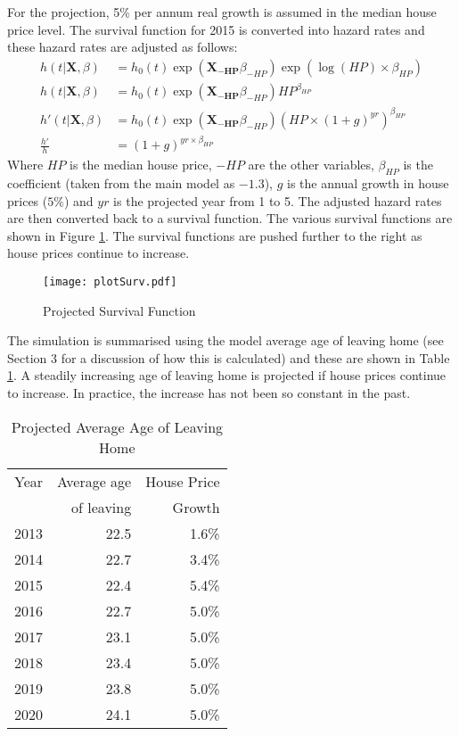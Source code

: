 \documentclass[12pt]{article}
\begin{document}
For the projection, 5\% per annum real growth is assumed in the median house price level. The survival function for 2015 is converted into hazard rates and these hazard rates are adjusted as follows:
\begin{align*}
    h(t|\mathbf{X}, \beta) &= h_0( t ) \exp( \mathbf{X_{-HP}}\beta_{-HP})  \exp ( \log(HP) \times  \beta_{HP} ) \\
    h(t|\mathbf{X}, \beta) &= h_0( t ) \exp( \mathbf{X_{-HP}}\beta_{-HP})  HP^{\beta_{HP}}  \\
    h'(t|\mathbf{X}, \beta) &= h_0( t ) \exp( \mathbf{X_{-HP}}\beta_{-HP}) (HP \times (1+g)^{yr})^{\beta_{HP}} \\
    \frac{h'}{h} &= (1+g)^{yr \times \beta_{HP}}
\end{align*}
Where $HP$ is the median house price, $-HP$ are the other variables, $\beta_{HP}$ is the coefficient (taken from the main model as $-1.3$), $g$ is the annual growth in house prices ($5\%$) and $yr$ is the projected year from 1 to 5. The adjusted hazard rates are then converted back to a survival function. The various survival functions are shown in Figure \ref{plotSurv}. The survival functions are pushed further to the right as house prices continue to increase.
\begin{figure}[htpb]
  \caption{Projected Survival Function}
  \label{plotSurv}
  \centering
  \texttt{[image: plotSurv.pdf]}
\end{figure}

The simulation is summarised using the model average age of leaving home (see Section 3 for a discussion of how this is calculated) and these are shown in Table \ref{ProgAvgAges}. A steadily increasing age of leaving home is projected if house prices continue to increase. In practice, the increase has not been so constant in the past.

\begin{table}[htbp]
\centering
\caption{Projected Average Age of Leaving Home}
\label{ProgAvgAges}
\begin{tabular}{lrr}
\toprule
Year & Average age & House Price \\
& of leaving & Growth \\
\midrule
2013 & 22.5 & 1.6\% \\
  2014 & 22.7 & 3.4\% \\
  2015 & 22.4 & 5.4\% \\
  2016 & 22.7 & 5.0\% \\
  2017 & 23.1 & 5.0\% \\
  2018 & 23.4 & 5.0\% \\
  2019 & 23.8 & 5.0\% \\
  2020 & 24.1 & 5.0\% \\
\bottomrule
\end{tabular}

\end{table}
\end{document}
